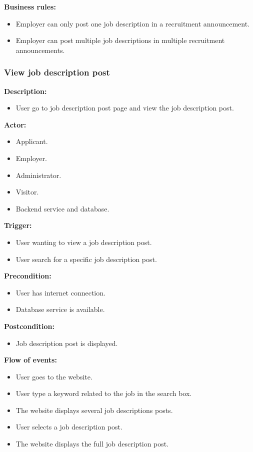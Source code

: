\documentclass[a4paper]{article}
\begin{document}
\textbf{Business rules:}
\begin{itemize}
  \item Employer can only post one job description in a recruitment announcement.
  \item Employer can post multiple job descriptions in multiple recruitment announcements.
\end{itemize}

\subsubsection{View job description post}
\textbf{Description:}
\begin{itemize}
  \item User go to job description post page and view the job description post.
\end{itemize}

\textbf{Actor:}
\begin{itemize}
  \item Applicant.
  \item Employer.
  \item Administrator.
  \item Visitor.
  \item Backend service and database.
\end{itemize}

\textbf{Trigger:}
\begin{itemize}
  \item User wanting to view a job description post.
  \item User search for a specific job description post.
\end{itemize}

\textbf{Precondition:}
\begin{itemize}
  \item User has internet connection.
  \item Database service is available.
\end{itemize}

\textbf{Postcondition:}
\begin{itemize}
  \item Job description post is displayed.
\end{itemize}

\textbf{Flow of events:}
\begin{itemize}
  \item User goes to the website.
  \item User type a keyword related to the job in the search box.
  \item The website displays several job descriptions posts.
  \item User selects a job description post.
  \item The website displays the full job description post.
\end{itemize}
\end{document}
